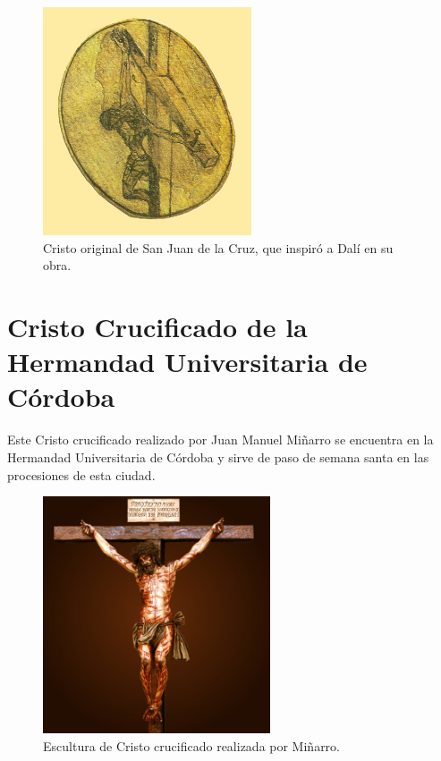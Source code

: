 \begin{figure}[H]
    \centering
    \includegraphics[width=0.55\textwidth]{sanju.jpg}
    \caption{Cristo original de San Juan de la Cruz, que inspiró a Dalí en su obra.\cite{RefWorks:44}} %
\end{figure}

\section{Cristo Crucificado de la Hermandad Universitaria de Córdoba} \label{app:crucificadominarro}

Este Cristo crucificado realizado por Juan Manuel Miñarro se encuentra en la Hermandad Universitaria de Córdoba y sirve de paso de semana santa en las procesiones de esta ciudad.

\begin{figure}[H]
    \centering
    \includegraphics[width=0.6\textwidth]{crucificadominarro.jpg}
    \caption{Escultura de Cristo crucificado realizada por Miñarro.\cite{RefWorks:70}} %
\end{figure}

